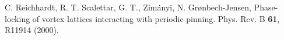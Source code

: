 \documentclass[twocolumn,preprintnumbers,amsmath,amssymb,aps,prx]{revtex4}
\begin{document}
\begin{thebibliography}{99}
     C. Reichhardt, R. T. Scalettar, G. T., Zim{\'a}nyi, N. Gr{\o}nbech-Jensen,  Phase-locking of vortex lattices interacting with periodic pinning.  Phys. Rev. B {\bf 61}, R11914 (2000).
     

      

    












\end{thebibliography}
\end{document}
